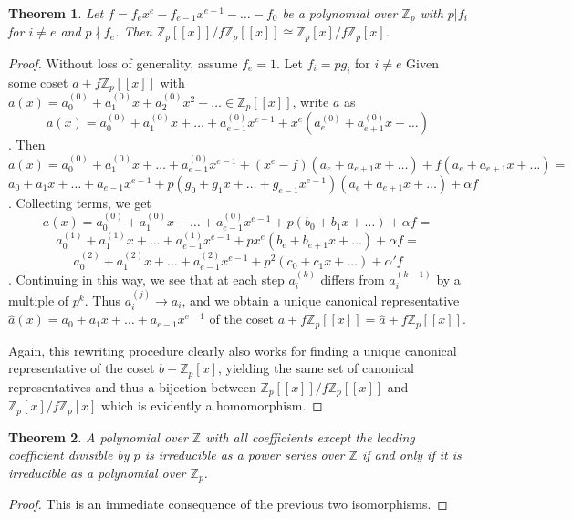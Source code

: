 \documentclass{article}
\newtheorem{theorem}{Theorem}
\begin{document}
\begin{theorem} \label{iso2}
Let $f=f_ex^e - f_{e-1}x^{e-1} - \ldots - f_0$ be a polynomial over $\mathbb{Z}_p$ with $p | f_i$ for $i \ne e$ and $p \nmid f_e$.  Then $\mathbb{Z}_p[[x]]/f\mathbb{Z}_p[[x]] \cong \mathbb{Z}_p[x]/f\mathbb{Z}_p[x]$.
\end{theorem}
\begin{proof}
Without loss of generality, assume $f_e = 1$.  Let $f_i = pg_i$ for $i \ne e$ Given some coset $a + f\mathbb{Z}_p[[x]]$ with $a(x) = a_0^{(0)} + a_1^{(0)}x + a_2^{(0)}x^2 + \ldots \in \mathbb{Z}_p[[x]]$, write $a$ as $$a(x) = a_0^{(0)} + a_1^{(0)}x + \ldots + a_{e-1}^{(0)}x^{e-1} + x^e(a_e^{(0)} + a_{e+1}^{(0)}x + \ldots)$$.  Then $$a(x) = a_0^{(0)} + a_1^{(0)}x + \ldots + a_{e-1}^{(0)}x^{e-1} + (x^e - f)(a_e + a_{e+1}x + \ldots) + f(a_e + a_{e+1}x + \ldots) = $$
$$a_0 + a_1x + \ldots + a_{e-1}x^{e-1} + p(g_0 + g_1x + \ldots + g_{e-1}x^{e-1})(a_e + a_{e+1}x + \ldots) + \alpha f$$.  Collecting terms, we get $$a(x) = a_0^{(0)} + a_1^{(0)}x + \ldots + a_{e-1}^{(0)}x^{e-1} + p(b_0 + b_1x + \ldots) + \alpha f = $$
$$a_0^{(1)} + a_1^{(1)}x + \ldots + a_{e-1}^{(1)}x^{e-1} + px^e(b_e + b_{e+1}x + \dots) + \alpha f =$$
$$a_0^{(2)} + a_1^{(2)}x + \ldots + a_{e-1}^{(2)}x^{e-1} + p^2(c_0 + c_1x + \ldots) + \alpha'f$$.  Continuing in this way, we see that at each step $a_i^{(k)}$ differs from $a_i^{(k-1)}$ by a multiple of $p^k$.  Thus $a_i^{(j)} \to a_i$, and we obtain a unique canonical representative $\hat{a}(x) = a_0 + a_1x + \ldots + a_{e-1}x^{e-1}$ of the coset $a + f\mathbb{Z}_p[[x]] = \hat{a} + f\mathbb{Z}_p[[x]]$.

Again, this rewriting procedure clearly also works for finding a unique canonical representative of the coset $b + \mathbb{Z}_p[x]$, yielding the same set of canonical representatives and thus a bijection between $\mathbb{Z}_p[[x]]/f\mathbb{Z}_p[[x]]$ and $\mathbb{Z}_p[x]/f\mathbb{Z}_p[x]$ which is evidently a homomorphism.
\end{proof}

\begin{theorem}
A polynomial over $\mathbb{Z}$ with all coefficients except the leading coefficient divisible by $p$ is irreducible as a power series over $\mathbb{Z}$ if and only if it is irreducible as a polynomial over $\mathbb{Z}_p$.
\end{theorem}
\begin{proof}
This is an immediate consequence of the previous two isomorphisms.
\end{proof}
\end{document}
